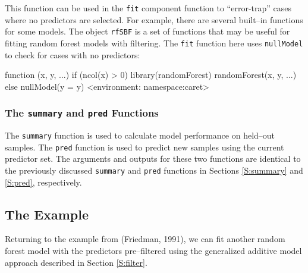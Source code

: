 \documentclass[12pt]{article}
\begin{document}
This function can be used in the \texttt{fit} component function to
``error-trap'' cases where no predictors are selected. For example,
there are several built--in functions for some models. The object
\texttt{rfSBF} is a set of functions that may be useful for fitting
random forest models with filtering. The \texttt{fit} function here
uses \texttt{nullModel} to check for cases with no predictors:
\begin{Schunk}
\begin{Soutput}
function (x, y, ...) 
{
    if (ncol(x) > 0) {
        library(randomForest)
        randomForest(x, y, ...)
    }
    else nullModel(y = y)
}
<environment: namespace:caret>
\end{Soutput}
\end{Schunk}

\subsubsection{The \texttt{summary} and \texttt{pred} Functions}

The \texttt{summary} function is used to calculate model performance on held--out samples. The \texttt{pred} function is used to predict new samples using the current
predictor set. The arguments and outputs for these two functions are identical to the previously discussed \texttt{summary} and \texttt{pred} functions in Sections \ref{S:summary} and \ref{S:pred}, respectively.

\subsection{The Example}

Returning to the example from (Friedman, 1991), we can fit another
random forest model with the predictors pre--filtered using the
generalized additive model approach described in Section \ref{S:filter}.
\end{document}
